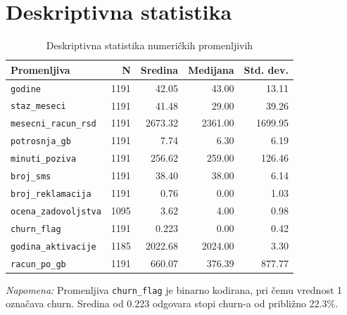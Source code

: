 \documentclass[a4paper,12pt]{article}
\begin{document}
    \section*{Deskriptivna statistika}
    \begin{table}[htbp]
    \centering
    \caption{Deskriptivna statistika numeričkih promenljivih}
    \label{tab:deskriptivna-statistika}
    \small
    \begin{tabular}{lrrrr}
    \toprule
    \textbf{Promenljiva} &
    \textbf{N} &
    \textbf{Sredina} &
    \textbf{Medijana} &
    \textbf{Std. dev.} \\
    \midrule

    \texttt{godine}
        & 1191 & 42.05 & 43.00 & 13.11 \\

    \texttt{staz\_meseci}
        & 1191 & 41.48 & 29.00 & 39.26 \\

    \texttt{mesecni\_racun\_rsd}
        & 1191 & 2673.32 & 2361.00 & 1699.95 \\

    \texttt{potrosnja\_gb}
        & 1191 & 7.74 & 6.30 & 6.19 \\

    \texttt{minuti\_poziva}
        & 1191 & 256.62 & 259.00 & 126.46 \\

    \texttt{broj\_sms}
        & 1191 & 38.40 & 38.00 & 6.14 \\

    \texttt{broj\_reklamacija}
        & 1191 & 0.76 & 0.00 & 1.03 \\

    \texttt{ocena\_zadovoljstva}
        & 1095 & 3.62 & 4.00 & 0.98 \\

    \texttt{churn\_flag}
        & 1191 & 0.223 & 0.00 & 0.42 \\

    \texttt{godina\_aktivacije}
        & 1185 & 2022.68 & 2024.00 & 3.30 \\

    \texttt{racun\_po\_gb}
        & 1191 & 660.07 & 376.39 & 877.77 \\

    \bottomrule
    \end{tabular}
    \end{table}

    \noindent
    \textit{Napomena:} Promenljiva \texttt{churn\_flag} je binarno kodirana,
    pri čemu vrednost 1 označava churn. Sredina od 0.223 odgovara stopi
    churn-a od približno 22.3\%.
\end{document}
